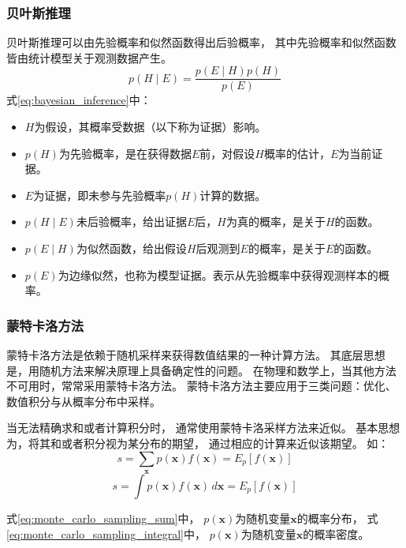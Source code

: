 \subsubsection{贝叶斯推理}
贝叶斯推理可以由先验概率和似然函数得出后验概率，
其中先验概率和似然函数皆由统计模型关于观测数据产生。
\begin{equation}
    \label{eq:bayesian_inference}
    p(H\mid E)=\frac{p(E \mid H)p(H)}{p(E)}
\end{equation}
式{\ref{eq:bayesian_inference}}中：
\begin{itemize}
    \item {$H$}为假设，其概率受数据（以下称为证据）影响。
    \item {$p(H)$}为先验概率，是在获得数据{$E$}前，对假设{$H$}概率的估计，{$E$}为当前证据。
    \item {$E$}为证据，即未参与先验概率{$p(H)$}计算的数据。
    \item {$p(H\mid E)$}未后验概率，给出证据{$E$}后，{$H$}为真的概率，是关于{$H$}的函数。
    \item {$p(E\mid H)$}为似然函数，给出假设{$H$}后观测到{$E$}的概率，是关于{$E$}的函数。
    \item {$p(E)$}为边缘似然，也称为模型证据。表示从先验概率中获得观测样本的概率。
\end{itemize}


\subsubsection{蒙特卡洛方法}

蒙特卡洛方法是依赖于随机采样来获得数值结果的一种计算方法。
其底层思想是，用随机方法来解决原理上具备确定性的问题。
在物理和数学上，当其他方法不可用时，常常采用蒙特卡洛方法。
蒙特卡洛方法主要应用于三类问题：优化、数值积分与从概率分布中采样。

当无法精确求和或者计算积分时，
通常使用蒙特卡洛采样方法来近似。
基本思想为，将其和或者积分视为某分布的期望，
通过相应的计算来近似该期望。
如：
\begin{equation}
    \label{eq:monte_carlo_sampling_sum}
    s=\sum_{\bm{x}} p(\bm{x})f(\bm{x})=E_p[f(\bm{x})]
\end{equation}
\begin{equation}
    \label{eq:monte_carlo_sampling_integral}
    s=\int  p(\bm{x})f(\bm{x}) \,d\bm{x}=E_p[f(\bm{x})]
\end{equation}

式{\ref{eq:monte_carlo_sampling_sum}}中，
{$p(\bm{x})$}为随机变量{$\bm{x}$}的概率分布，
式{\ref{eq:monte_carlo_sampling_integral}}中，
{$p(\bm{x})$}为随机变量{$\bm{x}$}的概率密度。

